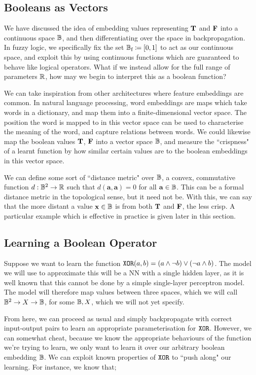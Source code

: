 \documentclass[conference]{report}
\begin{document}
\subsection{Booleans as Vectors}

We have discussed the idea of embedding values representing $\textbf{T}$ and $\textbf{F}$ into a continuous space $\mathbb{B}$, and then differentiating over the space in backpropagation. In fuzzy logic, we specifically fix the set $\mathbb{B}_\text{f}\coloneqq[0,1]$ to act as our continuous space, and exploit this by using continuous functions which are guaranteed to behave like logical operators. What if we instead allow for the full range of parameters $\mathbb{R}$, how may we begin to interpret this as a boolean function?

We can take inspiration from other architectures where feature embeddings are common. In natural language processing, word embeddings are maps which take words in a dictionary, and map them into a finite-dimensional vector space. The position the word is mapped to in this vector space can be used to characterise the meaning of the word, and capture relations between words. We could likewise map the boolean values $\textbf{T}$, $\textbf{F}$ into a vector space $\mathbb{B}$, and measure the ``crispness" of a learnt function by how similar certain values are to the boolean embeddings in this vector space.

We can define some sort of ``distance metric" over $\mathbb{B}$, a convex, commutative function $d : \mathbb{B}^2 \to \mathbb{R}$ such that $d(\mathbf{a, a}) = 0$ for all $\mathbf{a} \in \mathbb{B}$. This can be a formal distance metric in the topological sense, but it need not be. With this, we can say that the more distant a value $\mathbf{x} \in \mathbb{B}$ is from both $\textbf{T}$ and $\textbf{F}$, the less crisp. A particular example which is effective in practice is given later in this section.

\subsection{Learning a Boolean Operator}

Suppose we want to learn the function $\texttt{XOR}(a, b) = (a \land \lnot b) \lor (\lnot a \land b)$. The model we will use to approximate this will be a NN with a single hidden layer, as it is well known that this cannot be done by a simple single-layer perceptron model. The model will therefore map values between three spaces, which we will call $\mathbb{B}^2 \to X \to \mathbb{B}$, for some $\mathbb{B}, X$, which we will not yet specify.

From here, we can proceed as usual and simply backpropagate with correct input-output pairs to learn an appropriate parameterisation for $\texttt{XOR}$. However, we can somewhat cheat, because we know the appropriate behaviours of the function we're trying to learn, we only want to learn it over our arbitrary boolean embedding $\mathbb{B}$. We can exploit known properties of $\texttt{XOR}$ to ``push along" our learning. For instance, we know that;
\end{document}
